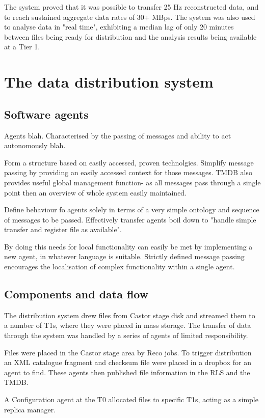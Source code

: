 \documentclass{cmspaper}
\begin{document}
The system proved that it was possible to transfer 25 Hz reconstructed data,
and to reach sustained aggregate data rates of 30+ MBps. The system was also
used to analyse data in "real time", exhibiting a median lag of only 20
minutes between files being ready for distribution and the analysis results
being available at a Tier 1.

\section{The data distribution system}
\subsection{Software agents}
Agents blah. Characterised by the passing of messages and ability to act
autonomously blah.

Form a structure based on easily accessed, proven technolgies. Simplify
message passing by providing an easily accessed context for those messages.
TMDB also provides useful global management function- as all messages pass
through a single point then an overview of whole system easily maintained.

Define behaviour fo agents solely in terms of a very simple ontology and
sequence of messages to be passed. Effectively transfer agents boil down to
"handle simple transfer and register file as available".

By doing this needs for local functionality can easily be met by
implementing a new agent, in whatever language is suitable. Strictly defined
message passing encourages the localisation of complex functionality within
a single agent.

\subsection{Components and data flow}
The distribution system drew files from Castor stage disk and streamed
them to a number of T1s, where they were placed in mass storage. The transfer 
of data through the system was handled by a series of agents of limited 
responsibility.

Files were placed in the Castor stage area by Reco jobs. To trigger 
distribution an XML catalogue fragment and checksum file were placed in a
dropbox for an agent to find. These agents then published file information
in the RLS and the TMDB.

A Configuration agent at the T0 allocated files to specific T1s, acting as a
simple replica manager.
\end{document}
